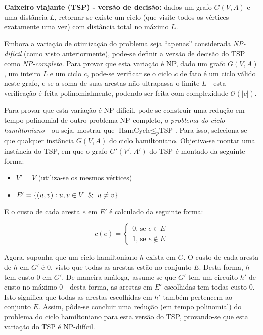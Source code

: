 \begin{trivlist}
\item \textbf{Caixeiro viajante (TSP) - versão de decisão:} dados um grafo $G(V, A)$ e uma distância $L$, retornar se existe um ciclo (que visite todos os vértices exatamente uma vez) com distância total no máximo $L$.
\end{trivlist}

Embora a variação de otimização do problema seja ``apenas'' considerada \textit{NP-difícil} (como visto anteriormente), pode-se definir a versão de decisão do TSP como \textit{NP-completa}. Para provar que esta variação é NP, dado um grafo $G(V, A)$, um inteiro $L$ e um ciclo $c$, pode-se verificar se o ciclo $c$ de fato é um ciclo válido neste grafo, e se a soma de suas arestas não ultrapassa o limite $L$ - esta verificação é feita polinomialmente, podendo ser feita com complexidade $\mathcal{O}(|c|)$.

Para provar que esta variação é NP-difícil, pode-se construir uma redução em tempo polinomial de outro problema NP-completo, o \textit{problema do ciclo hamiltoniano} - ou seja, mostrar que $\text{HamCycle} \leq_p \text{TSP}$. Para isso, seleciona-se que qualquer instância $G(V, A)$ do ciclo hamiltoniano. Objetiva-se montar uma instância do TSP, em que o grafo $G'(V', A')$ do TSP é montado da seguinte forma:

\begin{itemize}
    \item $V' = V$ (utiliza-se os mesmos vértices)
    \item $E' = \{(u, v) : u, v \in V \And u \neq v\}$
\end{itemize}

E o custo de cada aresta $e$ em $E'$ é calculado da seguinte forma:

$$
c(e) = 
\begin{cases}
\text{0, se } e \in E\\
\text{1, se } e \notin E
\end{cases}$$

Agora, suponha que um ciclo hamiltoniano $h$ exista em $G$. O custo de cada aresta de $h$ em $G'$ é $0$, visto que todas as arestas estão no conjunto $E$. Desta forma, $h$ tem custo 0 em $G'$. De maneira análoga, assume-se que $G'$ tem um circuito $h'$ de custo no máximo $0$ - desta forma, as arestas em $E'$ escolhidas tem todas custo $0$. Isto significa que todas as arestas escolhidas em $h'$ também pertencem ao conjunto $E$. Assim, pôde-se concluir uma redução (em tempo polinomial) do problema do ciclo hamiltoniano para esta versão do TSP, provando-se que esta variação do TSP é NP-difícil.

